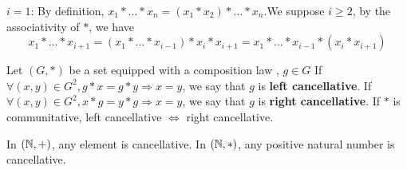 \documentclass{book}
\numberwithin{equation}{section}
\begin{document}
\begin{proofenv}
    \quad
    \newline
    $i=1$: By definition, $x_1*\dots *x_n=(x_1*x_2)*\dots *x_n$.We suppose $i\geq 2 $,  by the associativity of $*$,  we have
    $$x_1*\dots *x_{i+1}=(x_1*\dots *x_{i-1})*x_i*x_{i+1}=x_1*\dots *x_{i-1}*(x_i*x_{i+1})$$ 
\end{proofenv}
\begin{definitionenv}
    Let $(G, *)$ be a set equipped with a composition law ,  $g\in G$
    \newline
    If $\forall (x, y)\in G^2, g*x=g*y\Rightarrow x=y$, we say that $g$ is \textbf{left cancellative}.
    \newline
    If $\forall (x, y)\in G^2, x*g=y*g\Rightarrow x=y$, we say that $g$ is \textbf{right cancellative}.
    \newline
    If $*$ is communitative,  left cancellative $\Leftrightarrow$ right cancellative.
\end{definitionenv}
\begin{exampleenv}
    \quad
    \newline
    In $(\mathbb{N}, +)$,  any element is cancellative.
    \newline
    In $(\mathbb{N}, *)$,  any positive natural number is cancellative.

\end{exampleenv}
\end{document}
